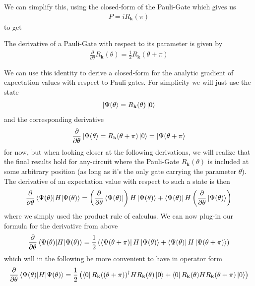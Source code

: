 We can simplify this, using the closed-form of the Pauli-Gate which gives us
\begin{align}
    P = iR_\mathbf{k}(\pi)
\end{align}
to get
\begin{theorem*}
The derivative of a Pauli-Gate with respect to its parameter is given by
\begin{align}
    \frac{\partial}{\partial \theta} R_\mathbf{k}(\theta) = \frac{1}{2}R_\mathbf{k}(\theta + \pi)
\end{align}    
\end{theorem*}

We can use this identity to derive a closed-form for the analytic gradient of expectation values with respect to Pauli gates.
For simplicity we will just use the state
\begin{align}
    \ket{\Psi(\theta} = R_\mathbf{k}(\theta)\ket{0}
\end{align}
and the corresponding derivative
\begin{align}
    \frac{\partial}{\partial \theta}\ket{\Psi(\theta} = R_\mathbf{k}(\theta+\pi)\ket{0} = \ket{\Psi(\theta + \pi}
\end{align}
for now, but when looking closer at the following derivations, we will realize that the final results hold for any-circuit where the Pauli-Gate $R_\mathbf{k}(\theta)$ is included at some arbitrary position (as long as it's the only gate carrying the parameter $\theta$). 
The derivative of an expectation value with respect to such a state is then
\begin{align}
    \frac{\partial}{\partial \theta} \expval{H}{\Psi(\theta)}  =\left(\frac{\partial}{\partial \theta}\bra{\Psi(\theta)}\right)H\ket{\Psi(\theta)} + \bra{\Psi(\theta)} H\left(\frac{\partial}{\partial \theta}\ket{\Psi(\theta)}\right)
\end{align}
where we simply used the product rule of calculus. 
We can now plug-in our formula for the derivative from above
\begin{align}
    \frac{\partial}{\partial \theta} \expval{H}{\Psi(\theta)} = \frac{1}{2}\left(\bra{\Psi(\theta+\pi)}H\ket{\Psi(\theta)} + \bra{\Psi(\theta)}H\ket{\Psi(\theta+\pi)}\right)
\end{align}
which will in the following be more convenient to have in operator form
\begin{align}
    \frac{\partial}{\partial \theta} \expval{H}{\Psi(\theta)} = \frac{1}{2}\left(\bra{0}R_\mathbf{k}((\theta+\pi))^\dagger H R_\mathbf{k}(\theta)\ket{0} + \bra{0}R_\mathbf{k}(\theta)HR_\mathbf{k}(\theta+\pi)\ket{0}\right)
\end{align}
